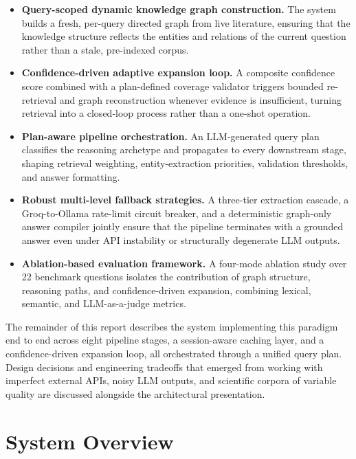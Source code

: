 \documentclass[11pt,a4paper]{article}
\begin{document}
\begin{itemize}[leftmargin=1.2em,itemsep=3pt]
  \item \textbf{Query-scoped dynamic knowledge graph construction.} The system
  builds a fresh, per-query directed graph from live literature, ensuring that
  the knowledge structure reflects the entities and relations of the current
  question rather than a stale, pre-indexed corpus.
  \item \textbf{Confidence-driven adaptive expansion loop.} A composite
  confidence score combined with a plan-defined coverage validator triggers
  bounded re-retrieval and graph reconstruction whenever evidence is
  insufficient, turning retrieval into a closed-loop process rather than a
  one-shot operation.
  \item \textbf{Plan-aware pipeline orchestration.} An LLM-generated query
  plan classifies the reasoning archetype and propagates to every downstream
  stage, shaping retrieval weighting, entity-extraction priorities,
  validation thresholds, and answer formatting.
  \item \textbf{Robust multi-level fallback strategies.} A three-tier
  extraction cascade, a Groq-to-Ollama rate-limit circuit breaker, and a
  deterministic graph-only answer compiler jointly ensure that the pipeline
  terminates with a grounded answer even under API instability or
  structurally degenerate LLM outputs.
  \item \textbf{Ablation-based evaluation framework.} A four-mode ablation
  study over 22 benchmark questions isolates the contribution of graph
  structure, reasoning paths, and confidence-driven expansion, combining
  lexical, semantic, and LLM-as-a-judge metrics.
\end{itemize}

The remainder of this report describes the system implementing this paradigm
end to end across eight pipeline stages, a session-aware caching layer, and
a confidence-driven expansion loop, all orchestrated through a unified query
plan. Design decisions and engineering tradeoffs that emerged from working
with imperfect external APIs, noisy LLM outputs, and scientific corpora of
variable quality are discussed alongside the architectural presentation.

\section{System Overview}
\end{document}
